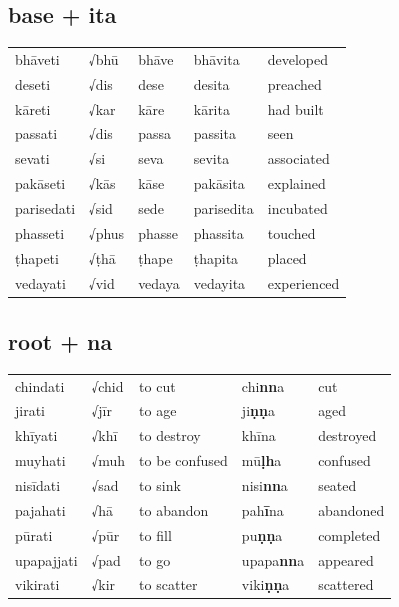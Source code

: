 \documentclass[11pt,oneside]{memoir}
\begin{document}
\subsection{base + ita}
\label{sec:orgbe1491d}

\begin{center}
\begin{tabular}{lllll}
bhāveti & √bhū & bhāve & bhāvita & developed\\[0pt]
deseti & √dis & dese & desita & preached\\[0pt]
kāreti & √kar & kāre & kārita & had built\\[0pt]
passati & √dis & passa & passita & seen\\[0pt]
sevati & √si & seva & sevita & associated\\[0pt]
pakāseti & √kās & kāse & pakāsita & explained\\[0pt]
parisedati & √sid & sede & parisedita & incubated\\[0pt]
phasseti & √phus & phasse & phassita & touched\\[0pt]
ṭhapeti & √ṭhā & ṭhape & ṭhapita & placed\\[0pt]
vedayati & √vid & vedaya & vedayita & experienced\\[0pt]
\end{tabular}
\end{center}

\subsection{root + na}
\label{sec:org615ee5c}

\begin{center}
\begin{tabular}{lllll}
chindati & √chid & to cut & chi\textbf{nn}a & cut\\[0pt]
jirati & √jīr & to age & ji\textbf{ṇṇ}a & aged\\[0pt]
khīyati & √khī & to destroy & khīna & destroyed\\[0pt]
muyhati & √muh & to be confused & mū\textbf{ḷh}a & confused\\[0pt]
nisīdati & √sad & to sink & nisi\textbf{nn}a & seated\\[0pt]
pajahati & √hā & to abandon & pah\textbf{ī}na & abandoned\\[0pt]
pūrati & √pūr & to fill & pu\textbf{ṇṇ}a & completed\\[0pt]
upapajjati & √pad & to go & upapa\textbf{nn}a & appeared\\[0pt]
vikirati & √kir & to scatter & viki\textbf{ṇṇ}a & scattered\\[0pt]
\end{tabular}
\end{center}
\end{document}
